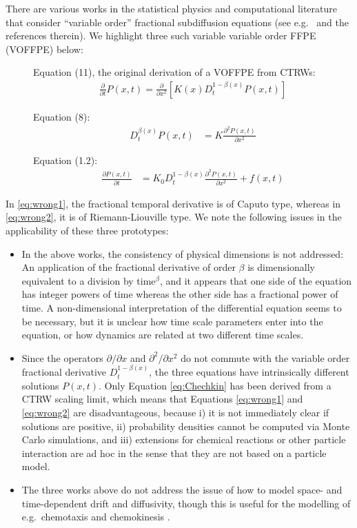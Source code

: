 \documentclass[a4paper,12pt]{elsarticle}
\numberwithin{equation}{section}
\theoremstyle{plain}
\theoremstyle{definition}
\theoremstyle{remark}
\numberwithin{equation}{section}
\newcommand{\1}{\mathbf 1}
\begin{document}
There are various works in the statistical physics and computational literature
that consider ``variable
order'' fractional subdiffusion equations (see e.g.\ 
\cite{Chechkin2005a,Sun2009,Chen2010,Sandev2015} and
the references therein). 
We highlight three such variable variable order FFPE (VOFFPE) below:
\begin{description}
  \item [\cite{Chechkin2005a}] Equation (11), the original derivation of a 
  VOFFPE from CTRWs: 
  \begin{align} \label{eq:Chechkin}
    \frac{\partial}{\partial t} P(x,t) 
    = \frac{\partial}{\partial x^2} 
    \left[K(x) D_t^{1-\beta(x)} P(x,t)\right]
  \end{align}
  \item [\cite{Sun2009}] Equation (8): 
  \begin{align}
  \label{eq:wrong1}
    D_t^{\beta(x)} P(x,t) &= K \frac{\partial^2 P(x,t)}{\partial x^2}
  \end{align}
  \item [\cite{Chen2010}] Equation (1.2):
  \begin{align}
  \label{eq:wrong2}
  \frac{\partial P(x,t)}{\partial t} &= K {_0 D_t^{1-\beta(x)}}
  \frac{\partial^2 P(x,t)}{\partial x^2} + f(x,t)
  \end{align}
\end{description}
In \eqref{eq:wrong1}, the fractional temporal derivative is of Caputo type,
whereas in \eqref{eq:wrong2}, it is of Riemann-Liouville type.
We note the following issues in the applicability of these three prototypes:
\begin{itemize}
  \item
  In the above works, the consistency of physical dimensions is not addressed: 
  An application of the
  fractional derivative of order $\beta$ is dimensionally equivalent to a
  division by time$^{\beta}$, and it appears that one side of the equation has 
  integer powers of time whereas the other side has a fractional power of time.
  A non-dimensional interpretation of the differential equation seems to be
  necessary, but it is unclear how time scale parameters enter into the
  equation, or how dynamics are related at two different time scales.
  \item
  Since the operators $\partial/\partial x$ and $\partial^2 / \partial x^2$
  do not commute with the variable order fractional derivative 
  $D_t^{1-\beta(x)}$, the three equations have intrinsically different solutions
  $P(x,t)$. 
  Only Equation \eqref{eq:Chechkin}
  has been derived from a CTRW scaling limit, which means that 
  Equations \eqref{eq:wrong1} and \eqref{eq:wrong2} are
  disadvantageous, because i) it is not immediately clear if solutions are 
  positive,
  ii) probability densities cannot be computed via Monte Carlo simulations,
  and iii) extensions for chemical reactions or other particle interaction are 
  ad hoc in the sense that they are not based on a particle model.
  \item
  The three works above do not address the issue of how to model space- and 
  time-dependent drift and diffusivity, though this is useful for the modelling 
  of e.g.\ chemotaxis and chemokinesis \cite{StrakaFedotov14}.
\end{itemize}
\end{document}
